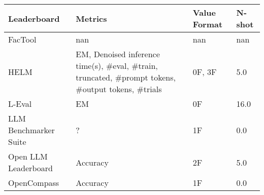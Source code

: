 \begin{tabular}{llll}
\toprule
Leaderboard & Metrics & Value Format & N-shot \\
\midrule
FacTool & nan & nan & nan \\
HELM & EM, Denoised inference time(s), \#eval, \#train, truncated, \#prompt tokens, \#output tokens, \#trials & 0F, 3F & 5.0 \\
L-Eval & EM & 0F & 16.0 \\
LLM Benchmarker Suite & ? & 1F & 0.0 \\
Open LLM Leaderboard & Accuracy & 2F & 5.0 \\
OpenCompass & Accuracy & 1F & 0.0 \\
\bottomrule
\end{tabular}
